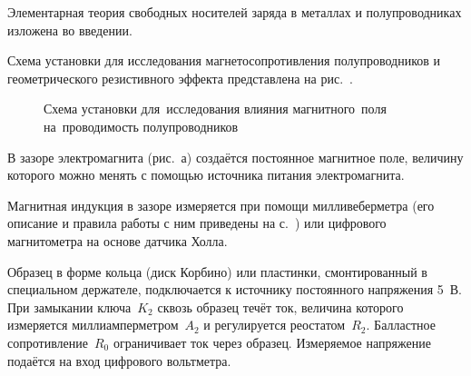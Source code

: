 


Элементарная теория свободных носителей заряда в металлах и полупроводниках
изложена во введении.


\experiment
Схема установки для исследования магнетосопротивления
полупроводников и геометрического резистивного эффекта представлена на
рис.~.
\begin{figure}[h!]
	\caption{Схема установки для~исследования влияния магнитного~поля
на~проводимость полупроводников}
\end{figure}

В зазоре электромагнита (рис.~а) создаётся постоянное магнитное
поле, величину которого можно менять с помощью источника питания электромагнита.

Магнитная индукция в зазоре измеряется при помощи милливеберметра (его описание
и правила работы с ним приведены на с.~\pageref{MWB}) или цифрового магнитометра
на основе датчика Холла.

Образец в форме кольца (диск Корбино) или пластинки, смонтированный в
специальном держателе, подключается к источнику постоянного напряжения 5~В. При
замыкании ключа~$K_2$ сквозь образец течёт ток, величина которого измеряется
миллиамперметром~$A_2$ и регулируется реостатом~$R_2$. Балластное сопротивление~$R_0$
ограничивает ток через образец. Измеряемое напряжение подаётся на вход
цифрового вольтметра.

